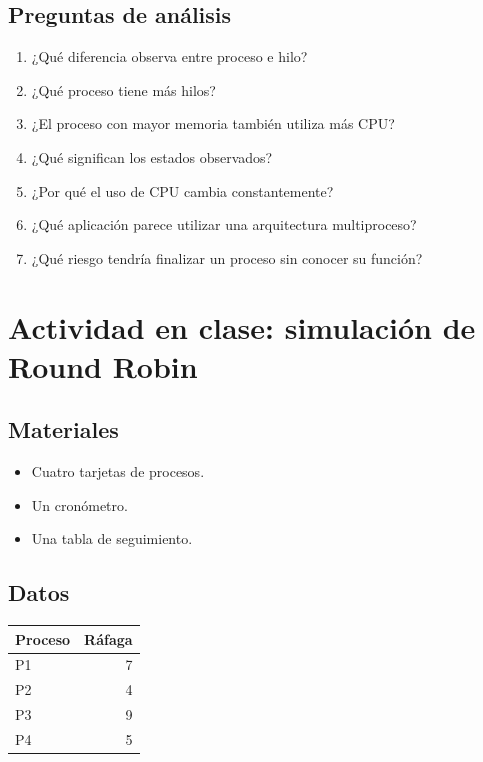 \documentclass[
  spanish,
  letterpaper,
]{scrbook}
\newcounter{none} %
\providecommand{\tightlist}{%
  \setlength{\itemsep}{0pt}\setlength{\parskip}{0pt}}
\begin{document}
\section{Preguntas de análisis}\label{preguntas-de-anuxe1lisis}

\begin{enumerate}
\def\labelenumi{\arabic{enumi}.}
\tightlist
\item
  ¿Qué diferencia observa entre proceso e hilo?
\item
  ¿Qué proceso tiene más hilos?
\item
  ¿El proceso con mayor memoria también utiliza más CPU?
\item
  ¿Qué significan los estados observados?
\item
  ¿Por qué el uso de CPU cambia constantemente?
\item
  ¿Qué aplicación parece utilizar una arquitectura multiproceso?
\item
  ¿Qué riesgo tendría finalizar un proceso sin conocer su función?
\end{enumerate}


\chapter{Actividad en clase: simulación de Round
Robin}\label{actividad-en-clase-simulaciuxf3n-de-round-robin}

\section{Materiales}\label{materiales}

\begin{itemize}
\tightlist
\item
  Cuatro tarjetas de procesos.
\item
  Un cronómetro.
\item
  Una tabla de seguimiento.
\end{itemize}

\section{Datos}\label{datos}

{\def\LTcaptype{none} %
\begin{longtable}[]{@{}lr@{}}
\toprule\noalign{}
Proceso & Ráfaga \\
\midrule\noalign{}
\endhead
\bottomrule\noalign{}
\endlastfoot
P1 & 7 \\
P2 & 4 \\
P3 & 9 \\
P4 & 5 \\
\end{longtable}
}
\end{document}
